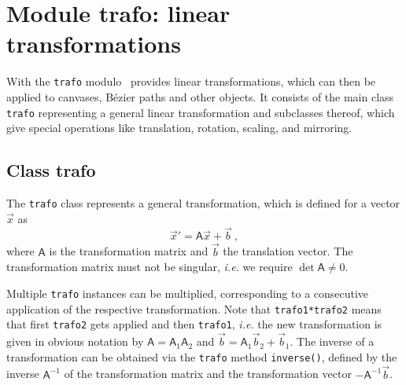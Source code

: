 \chapter{Module trafo: linear transformations}

\label{trafo}

With the  \verb|trafo| modulo \PyX\ provides linear transformations, which can then
be applied to canvases,  B\'ezier paths and other objects. It consists
of the main class \verb|trafo| representing a general linear
transformation and subclasses thereof, which give special operations
like translation, rotation, scaling, and mirroring.

\section{Class trafo}

The \verb|trafo| class represents a general
transformation, which is defined for a vector $\vec{x}$ as
\[
  \vec{x}' = \mathsf{A} \vec{x} + \vec{b}\ ,
\]
where $\mathsf{A}$ is the transformation matrix and $\vec{b}$ the
translation vector. The transformation matrix must not be singular,
\textit{i.e.} we require $\det \mathsf{A} \ne 0$.



Multiple \verb|trafo| instances can be multiplied, corresponding to a
consecutive application of the respective transformation. Note that
\verb|trafo1*trafo2| means that first \verb|trafo2| gets applied and
then \verb|trafo1|, \textit{i.e.} the new transformation is given in
obvious notation by $\mathsf{A} = \mathsf{A}_1 \mathsf{A}_2$ and
$\vec{b} = \mathsf{A}_1 \vec{b}_2 + \vec{b}_1$. The inverse of a
transformation can be obtained via the \verb|trafo| method
\verb|inverse()|, defined by the inverse $\mathsf{A}^{-1}$ of the
transformation matrix and the transformation vector $-\mathsf{A}^{-1}\vec{b}$.






